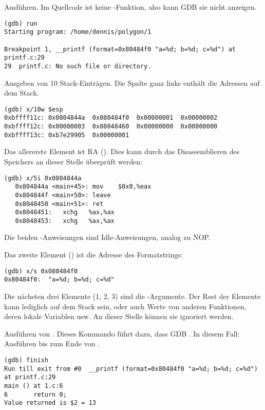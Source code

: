 Ausführen.
Im Quellcode ist keine \printf-Funktion, also kann \ac{GDB} sie nicht anzeigen.

\begin{lstlisting}
(gdb) run
Starting program: /home/dennis/polygon/1 

Breakpoint 1, __printf (format=0x80484f0 "a=%d; b=%d; c=%d") at printf.c:29
29	printf.c: No such file or directory.
\end{lstlisting}

Ausgeben von 10 Stack-Einträgen. Die Spalte ganz links enthält die Adressen auf dem Stack.

\begin{lstlisting}
(gdb) x/10w $esp
0xbffff11c:	0x0804844a	0x080484f0	0x00000001	0x00000002
0xbffff12c:	0x00000003	0x08048460	0x00000000	0x00000000
0xbffff13c:	0xb7e29905	0x00000001
\end{lstlisting}

Das allererste Element ist \ac{RA} ().
Dies kann durch das Disassemblieren des Speichers an dieser Stelle überprüft werden:

\begin{lstlisting}[label=NOP_as_XCHG_example]
(gdb) x/5i 0x0804844a
   0x804844a <main+45>:	mov    $0x0,%eax
   0x804844f <main+50>:	leave  
   0x8048450 <main+51>:	ret    
   0x8048451:	xchg   %ax,%ax
   0x8048453:	xchg   %ax,%ax
\end{lstlisting}

Die beiden -Anweisungen sind Idle-Anweisungen, analog zu \ac{NOP}.

Das zweite Element () ist die Adresse des Formatstrings:

\begin{lstlisting}
(gdb) x/s 0x080484f0
0x80484f0:	"a=%d; b=%d; c=%d"
\end{lstlisting}

Die nächsten drei Elemente (1, 2, 3) sind die \printf-Argumente.
Der Rest der Elemente kann lediglich  auf dem Stack sein,
oder auch Werte von anderen Funktionen, deren lokale Variablen usw.
An dieser Stelle können sie ignoriert werden.

Ausführen von .
Dieses Kommando führt dazu, dass GDB .
In diesem Fall: Ausführen bis zum Ende von \printf.

\begin{lstlisting}
(gdb) finish
Run till exit from #0  __printf (format=0x80484f0 "a=%d; b=%d; c=%d") at printf.c:29
main () at 1.c:6
6		return 0;
Value returned is $2 = 13
\end{lstlisting}

